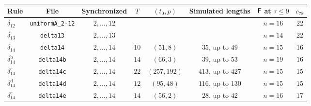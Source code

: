 \begin{tabular}{@{}lccccccc@{}}
\toprule
Rule & File & Synchronized & $T$ & $(t_0,p)$ & Simulated lengths & $\mathsf F$ at $\tau\le9$ & $c_{78}$\\
\midrule
$\delta_{12}$ & \texttt{uniformA\_2-12} & $2,\dots,12$ & & & & $n=16$ & $22$\\
$\delta_{13}$ & \texttt{delta13} & $2,\dots,13$ & & & & $n=14$ & $22$\\
$\delta_{14}$ & \texttt{delta14} & $2,\dots,14$ & $10$ & $(51,8)$ & $35$, up to $49$ & $n=15$ & $16$\\
$\delta_{14}^{\mathrm b}$ & \texttt{delta14b} & $2,\dots,14$ & $14$ & $(66,3)$ & $39$, up to $53$ & $n=19$ & $16$\\
$\delta_{14}^{\mathrm c}$ & \texttt{delta14c} & $2,\dots,14$ & $22$ & $(257,192)$ & $413$, up to $427$ & $n=15$ & $15$\\
$\delta_{14}^{\mathrm d}$ & \texttt{delta14d} & $2,\dots,14$ & $12$ & $(95,48)$ & $116$, up to $130$ & $n=15$ & $15$\\
$\delta_{14}^{\mathrm e}$ & \texttt{delta14e} & $2,\dots,14$ & $14$ & $(56,2)$ & $28$, up to $42$ & $n=16$ & $17$\\
\bottomrule
\end{tabular}
